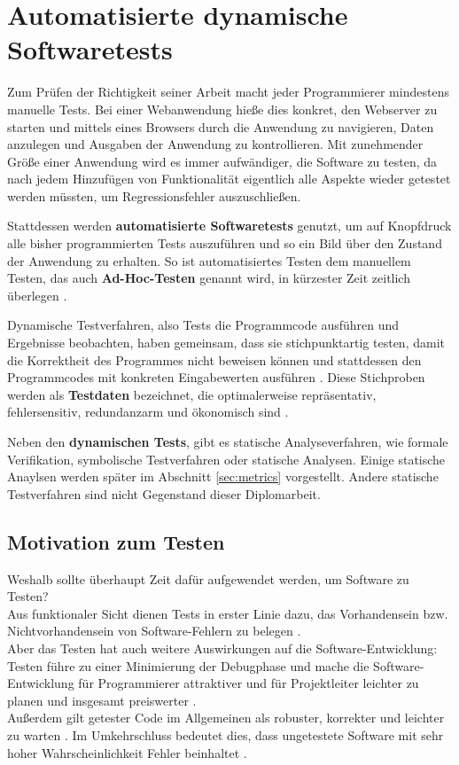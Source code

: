\chapter{Automatisierte dynamische Softwaretests}
\label{sec:test}
Zum Prüfen der Richtigkeit seiner Arbeit macht jeder Programmierer mindestens manuelle Tests. Bei einer Webanwendung hieße dies konkret, den Webserver zu starten und mittels eines Browsers durch die Anwendung zu navigieren, Daten anzulegen und Ausgaben der Anwendung zu kontrollieren. Mit zunehmender Größe einer Anwendung wird es immer aufwändiger, die Software zu testen, da nach jedem Hinzufügen von Funktionalität eigentlich alle Aspekte wieder getestet werden müssten, um Regressionsfehler auszuschließen.

Stattdessen werden \textbf{automatisierte Softwaretests} genutzt, um auf Knopfdruck alle bisher programmierten Tests auszuführen und so ein Bild über den Zustand der Anwendung zu erhalten. So ist automatisiertes Testen dem manuellem Testen, das auch \textbf{Ad-Hoc-Testen} genannt wird, in kürzester Zeit zeitlich überlegen \citep{rappin_rails_2011}.

Dynamische Testverfahren, also Tests die Programmcode ausführen und Ergebnisse beobachten, haben gemeinsam, dass sie stichpunktartig testen, damit die Korrektheit des Programmes nicht beweisen können und stattdessen den Programmcodes mit konkreten Eingabewerten ausführen \citep[S. 49]{liggesmeyer_modultest_1990}. Diese Stichproben werden als \textbf{Testdaten} bezeichnet, die optimalerweise repräsentativ, fehlersensitiv, redundanzarm und ökonomisch sind \citep[S. 51]{liggesmeyer_modultest_1990}.

Neben den \textbf{dynamischen Tests}, gibt es statische Analyseverfahren, wie formale Verifikation, symbolische Testverfahren oder statische Analysen. Einige statische Anaylsen werden später im Abschnitt \ref{sec:metrics} vorgestellt. Andere statische Testverfahren sind nicht Gegenstand dieser Diplomarbeit.

\section{Motivation zum Testen}
Weshalb sollte überhaupt Zeit dafür aufgewendet werden, um Software zu Testen?\\
Aus funktionaler Sicht dienen Tests in erster Linie dazu, das Vorhandensein bzw. Nichtvorhandensein von Software-Fehlern zu belegen \citep{goodliffe_code_2006}.\\
Aber das Testen hat auch weitere Auswirkungen auf die Software-Entwicklung: Testen führe zu einer Minimierung der Debugphase und mache die Software\hyp{}Entwicklung für Programmierer attraktiver und für Projektleiter leichter zu planen \citep{orsini_rails_2007} und insgesamt preiswerter \citep[S.13]{liggesmeyer_modultest_1990}.\\
Außerdem gilt getester Code im Allgemeinen als robuster, korrekter und leichter zu warten \citep{rappin_rails_2011}. Im Umkehrschluss bedeutet dies, dass ungetestete Software mit sehr hoher Wahrscheinlichkeit Fehler beinhaltet \citep{goodliffe_code_2006}.

